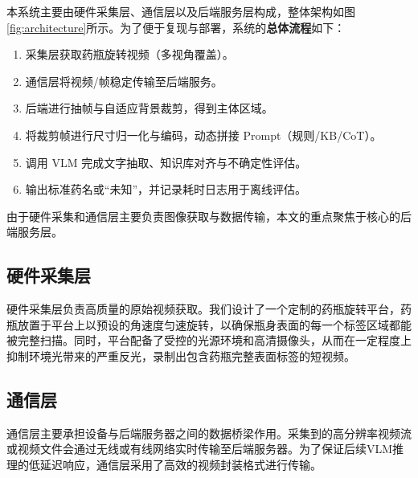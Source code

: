 \documentclass[11pt,a4paper]{ctexart}
\begin{document}
本系统主要由硬件采集层、通信层以及后端服务层构成，整体架构如图\ref{fig:architecture}所示。为了便于复现与部署，系统的\textbf{总体流程}如下：
\begin{enumerate}
    \item 采集层获取药瓶旋转视频（多视角覆盖）。
    \item 通信层将视频/帧稳定传输至后端服务。
    \item 后端进行抽帧与自适应背景裁剪，得到主体区域。
    \item 将裁剪帧进行尺寸归一化与编码，动态拼接 Prompt（规则/KB/CoT）。
    \item 调用 VLM 完成文字抽取、知识库对齐与不确定性评估。
    \item 输出标准药名或“未知”，并记录耗时日志用于离线评估。
\end{enumerate}
由于硬件采集和通信层主要负责图像获取与数据传输，本文的重点聚焦于核心的后端服务层。

\subsection{硬件采集层}
硬件采集层负责高质量的原始视频获取。我们设计了一个定制的药瓶旋转平台，药瓶放置于平台上以预设的角速度匀速旋转，以确保瓶身表面的每一个标签区域都能被完整扫描。同时，平台配备了受控的光源环境和高清摄像头，从而在一定程度上抑制环境光带来的严重反光，录制出包含药瓶完整表面标签的短视频。

\subsection{通信层}
通信层主要承担设备与后端服务器之间的数据桥梁作用。采集到的高分辨率视频流或视频文件会通过无线或有线网络实时传输至后端服务器。为了保证后续VLM推理的低延迟响应，通信层采用了高效的视频封装格式进行传输。
\end{document}
